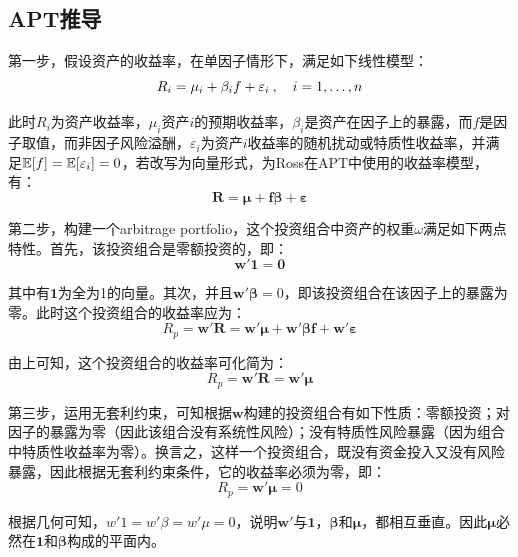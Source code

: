 \documentclass[11pt]{article}
\begin{document}
\appendix

\begin{appendices}

\section{APT推导}

第一步，假设资产的收益率，在单因子情形下，满足如下线性模型：
\begin{equation*}
    R_i = \mu_i + \beta_i f + \varepsilon_i \:,\quad i =1,\dots,n
\end{equation*}

此时$R_i$为资产收益率，$\mu_i$资产$i$的预期收益率，$\beta_i$是资产在因子上的暴露，而$f$是因子取值，而非因子风险溢酬，$\varepsilon_i$为资产$i$收益率的随机扰动或特质性收益率，并满足$\mathbb{E}[f]=\mathbb{E}[\varepsilon_i]=0$，若改写为向量形式，为Ross在APT中使用的收益率模型，有：
\begin{equation*}
    \bm{R} = \bm{\mu + f\beta + \varepsilon}
\end{equation*}

第二步，构建一个arbitrage portfolio，这个投资组合中资产的权重$\omega$满足如下两点特性。首先，该投资组合是零额投资的，即：
\begin{equation*}
    \bm{w' 1 = 0}
\end{equation*}

其中有$\bm{1}$为全为1的向量。其次，并且$\bm{w'\beta}=0$，即该投资组合在该因子上的暴露为零。此时这个投资组合的收益率应为：
\begin{equation*}
    R_p = \bm{w'R = w'\mu + w'\beta f + w'\varepsilon}
\end{equation*}

由上可知，这个投资组合的收益率可化简为：
\begin{equation*}
    R_p = \bm{w'R = w'\mu} 
\end{equation*}

第三步，运用无套利约束，可知根据$\bm{w}$构建的投资组合有如下性质：零额投资；对因子的暴露为零（因此该组合没有系统性风险）；没有特质性风险暴露（因为组合中特质性收益率为零）。换言之，这样一个投资组合，既没有资金投入又没有风险暴露，因此根据无套利约束条件，它的收益率必须为零，即：
\begin{equation*}
    R_p = \bm{w'\mu} = 0
\end{equation*}

根据几何可知，$w' 1 = w' \beta = w'\mu = 0$，说明$\bm{w'}$与$\bm{1}$，$\bm{\beta}$和$\bm{\mu}$，都相互垂直。因此$\bm{\mu}$必然在$\bm{1}$和$\bm{\beta}$构成的平面内。


\end{appendices}
\end{document}
